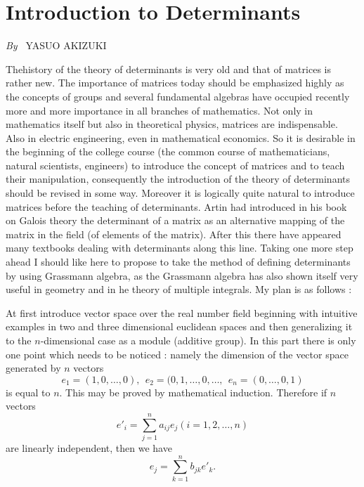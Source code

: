 
\chapter{Introduction to Determinants}

\begin{center}
{\em By~} YASUO AKIZUKI
\end{center}

\setcounter{pageoriginal}{40}
The\pageoriginale history of the theory of determinants is very old
and that of matrices is rather new. The importance of matrices today
should be emphasized highly as the concepts of groups and several
fundamental algebras have occupied recently more and more importance
in all branches of mathematics. Not only in mathematics itself but
also in theoretical physics, matrices are indispensable. Also in
electric engineering, even in mathematical economics. So it is
desirable in the beginning of the college course (the common course of
mathematicians, natural scientists, engineers) to introduce the
concept of matrices and to teach their manipulation, consequently the
introduction of the theory of determinants should be revised in some
way. Moreover it is logically quite natural to introduce matrices
before the teaching of determinants. Artin had introduced in his book
on Galois theory the determinant of a matrix as an alternative mapping
of the matrix in the field (of elements of the matrix). After this
there have appeared many textbooks dealing with determinants along
this line. Taking one more step ahead I should like here to propose to
take the method of defining determinants by using Grassmann algebra,
as the Grassmann algebra has also shown itself very useful in geometry
and in he theory of multiple integrals. My plan is as follows :

At first introduce vector space over the real number field beginning
with intuitive examples in two and three dimensional euclidean spaces
and then generalizing it to the $n$-dimensional case as a module
(additive group). In this part there is only one point which needs to
be noticed : namely the dimension of the vector space generated by $n$
vectors
$$
e_1 = (1,0, \ldots, 0), ~~e_2 = (0, 1, \ldots, 0, \ldots, ~~e_n = (0,
\ldots , 0 ,1)
$$
is equal to $n$. This may be proved by mathematical
induction. Therefore if $n$ vectors
\begin{equation*}
e'_i = \sum\limits^n_{j=1} a_{ij} e_j (i= 1, 2, \ldots,n) \tag{1}
\end{equation*}\pageoriginale
are linearly independent, then we have
\begin{equation*}
e_j = \sum\limits^n_{k=1} b_{jk} e'_k. \tag{2}
\end{equation*}

